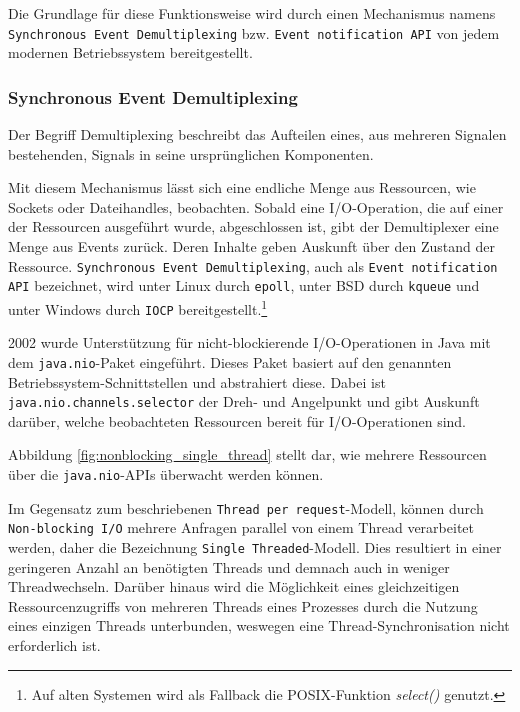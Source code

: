 Die Grundlage für diese Funktionsweise wird durch einen Mechanismus namens \verb|Synchronous Event Demultiplexing|
bzw. \verb|Event notification API| von jedem modernen Betriebssystem bereitgestellt.

\subsubsection{Synchronous Event Demultiplexing}
\label{subsubsec:event demultiplexing}
Der Begriff Demultiplexing beschreibt das Aufteilen eines, aus mehreren Signalen bestehenden, Signals
in seine ursprünglichen Komponenten.

Mit diesem Mechanismus lässt sich eine endliche Menge aus Ressourcen, wie Sockets oder Dateihandles, beobachten.
Sobald eine I/O-Operation, die auf einer der Ressourcen ausgeführt wurde, abgeschlossen ist, gibt der Demultiplexer eine Menge aus Events
zurück. Deren Inhalte geben Auskunft über den Zustand der Ressource.\newline
\verb|Synchronous Event Demultiplexing|, auch als \verb|Event notification API| bezeichnet, wird unter Linux durch \verb|epoll|, unter BSD durch
\verb|kqueue| und unter
Windows durch \verb|IOCP| bereitgestellt.\footnote{Auf alten Systemen wird als Fallback die POSIX-Funktion \textit{select()} genutzt.}

2002 wurde Unterstützung für nicht-blockierende I/O-Operationen in Java mit dem \verb|java.nio|-Paket eingeführt.
Dieses Paket basiert auf den genannten Betriebssystem-Schnittstellen und abstrahiert diese.\parencite{OpenJDKNIO}
Dabei ist \verb|java.nio.channels.selector| der Dreh- und Angelpunkt und gibt Auskunft darüber, welche
beobachteten Ressourcen bereit für I/O-Operationen sind.

Abbildung \ref{fig:nonblocking_single_thread} stellt dar, wie mehrere Ressourcen über die
\verb|java.nio|-APIs überwacht werden können.

Im Gegensatz zum beschriebenen \verb|Thread per request|-Modell, können durch \newline\verb|Non-blocking I/O|
mehrere Anfragen parallel von einem Thread verarbeitet werden, daher die Bezeichnung \verb|Single Threaded|-Modell.
Dies resultiert in einer geringeren Anzahl an benötigten Threads und demnach auch in weniger Threadwechseln.
Darüber hinaus wird die Möglichkeit eines gleichzeitigen Ressourcenzugriffs von mehreren Threads eines Prozesses
durch die Nutzung eines einzigen Threads unterbunden, weswegen eine Thread-Synchronisation nicht erforderlich ist.

